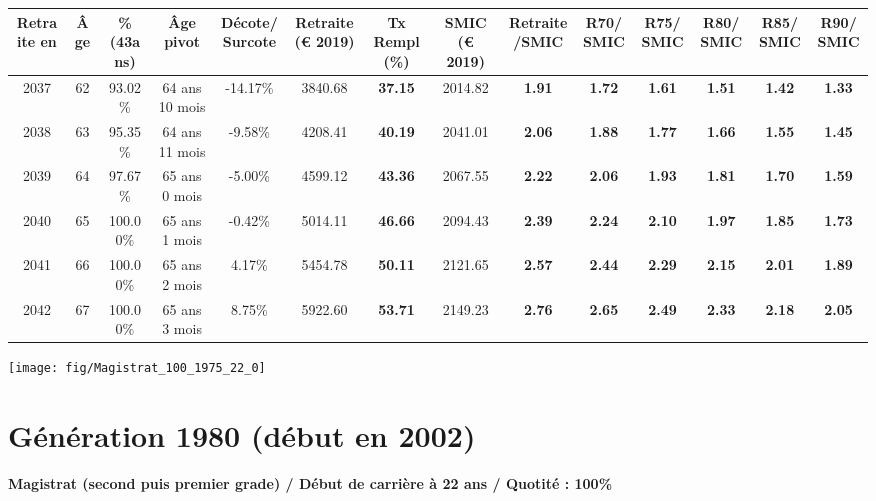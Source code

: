 \begin{adjustbox}{max width=\textwidth} 
\begin{tabular}[htb]{|c|c||c|c|c||c|c||c|c||c|c|c|c|c|} 
\hline 
 Retraite en &  Âge &  \%(43ans) &  Âge pivot &  Décote/Surcote &  Retraite (\euro{} 2019) &  Tx Rempl(\%) &  SMIC (\euro{} 2019) &  Retraite/SMIC &  R70/SMIC &  R75/SMIC &  R80/SMIC &  R85/SMIC &  R90/SMIC \\ 
\hline \hline 
 2037 &  62 &  93.02\% &  64 ans 10 mois &  -14.17\% &  3840.68 &  {\bf 37.15} &  2014.82 &  {\bf 1.91} &  {\bf 1.72} &  {\bf 1.61} &  {\bf 1.51} &  {\bf 1.42} &  {\bf 1.33} \\ 
\hline 
 2038 &  63 &  95.35\% &  64 ans 11 mois &  -9.58\% &  4208.41 &  {\bf 40.19} &  2041.01 &  {\bf 2.06} &  {\bf 1.88} &  {\bf 1.77} &  {\bf 1.66} &  {\bf 1.55} &  {\bf 1.45} \\ 
\hline 
 2039 &  64 &  97.67\% &  65 ans 0 mois &  -5.00\% &  4599.12 &  {\bf 43.36} &  2067.55 &  {\bf 2.22} &  {\bf 2.06} &  {\bf 1.93} &  {\bf 1.81} &  {\bf 1.70} &  {\bf 1.59} \\ 
\hline 
 2040 &  65 &  100.00\% &  65 ans 1 mois &  -0.42\% &  5014.11 &  {\bf 46.66} &  2094.43 &  {\bf 2.39} &  {\bf 2.24} &  {\bf 2.10} &  {\bf 1.97} &  {\bf 1.85} &  {\bf 1.73} \\ 
\hline 
 2041 &  66 &  100.00\% &  65 ans 2 mois &  4.17\% &  5454.78 &  {\bf 50.11} &  2121.65 &  {\bf 2.57} &  {\bf 2.44} &  {\bf 2.29} &  {\bf 2.15} &  {\bf 2.01} &  {\bf 1.89} \\ 
\hline 
 2042 &  67 &  100.00\% &  65 ans 3 mois &  8.75\% &  5922.60 &  {\bf 53.71} &  2149.23 &  {\bf 2.76} &  {\bf 2.65} &  {\bf 2.49} &  {\bf 2.33} &  {\bf 2.18} &  {\bf 2.05} \\ 
\hline 
\hline 
\end{tabular} 
\end{adjustbox} 
 
 \vspace{0.1cm} 

 {\hspace{-2.2cm}\texttt{[image: fig/Magistrat\_100\_1975\_22\_0]}} 

\newpage 
 
\section{Génération 1980 (début en 2002)\label{Magistrat_100_1980_22_0}} 
 
{\bf \noindent Magistrat (second puis premier grade) / Début de carrière à 22 ans / Quotité : 100\%}  ~ 

